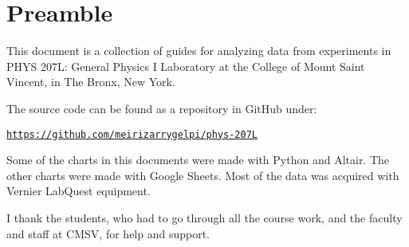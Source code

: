 \chapter*{Preamble}
%
This document is a collection of guides for analyzing data from experiments in PHYS 207L: General Physics I Laboratory at the College of Mount Saint Vincent, in The Bronx, New York.

The source code can be found as a repository in GitHub under:
\begin{center}
    \href{https://github.com/meirizarrygelpi/phys-207L}{\texttt{https://github.com/meirizarrygelpi/phys-207L}}
\end{center}
Some of the charts in this documents were made with Python and Altair. The other charts were made with Google Sheets. Most of the data was acquired with Vernier LabQuest equipment.

I thank the students, who had to go through all the course work, and the faculty and staff at CMSV, for help and support.